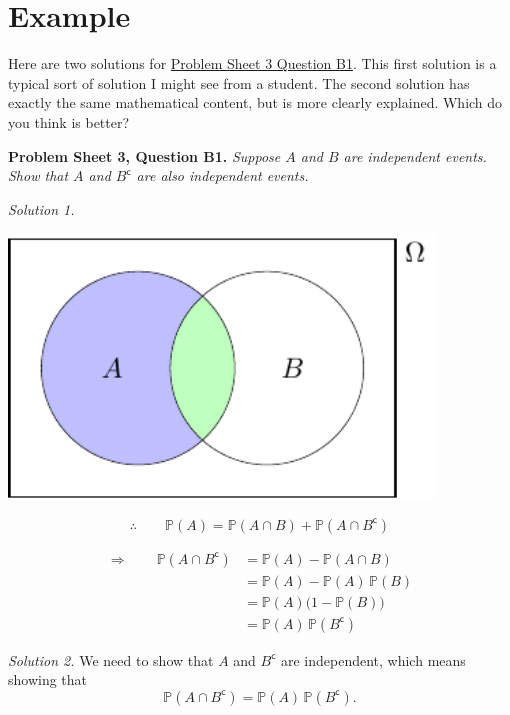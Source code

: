 \documentclass[
  a4paper,
]{book}
\theoremstyle{definition}
\theoremstyle{definition}
\theoremstyle{definition}
\theoremstyle{definition}
\theoremstyle{remark}
\begin{document}
\hypertarget{writing-ex}{%
\section*{Example}\label{writing-ex}}

Here are two solutions for \protect\hyperlink{P3-long}{Problem Sheet 3 Question B1}. This first solution is a typical sort of solution I might see from a student. The second solution has exactly the same mathematical content, but is more clearly explained. Which do you think is better?

\textbf{Problem Sheet 3, Question B1.} \emph{Suppose \(A\) and \(B\) are independent events. Show that \(A\) and \(B^\mathsf{c}\) are also independent events.}

\emph{Solution 1.}

\begin{center}\includegraphics[width=320pt]{math1710_files/figure-latex/writing-pic-0-1} \end{center}

\[ \therefore \qquad \mathbb P(A) = \mathbb P(A \cap B) + \mathbb P(A \cap B^\mathsf{c})  \]

\begin{align*}
\Rightarrow \qquad \mathbb P(A \cap B^\mathsf{c})
&= \mathbb P(A) - \mathbb P(A \cap B) \\
&= \mathbb P(A) - \mathbb P(A)\,\mathbb P(B) \\
&= \mathbb P(A) \big(1 - \mathbb P(B)\big) \\
&= \mathbb P(A) \, \mathbb P(B^\mathsf{c}) 
\end{align*}

\emph{Solution 2.}
We need to show that \(A\) and \(B^\mathsf{c}\) are independent, which means showing that
\[ \mathbb P(A \cap B^\mathsf{c}) = \mathbb P(A) \, \mathbb P(B^\mathsf{c}) . \tag{$*$} \]
\end{document}
